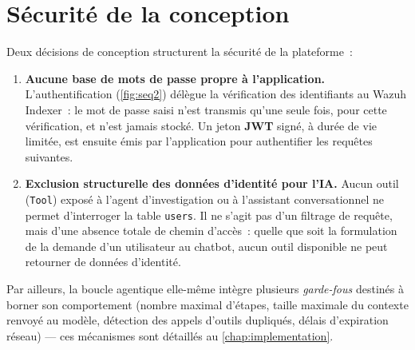 \section{Sécurité de la conception}
\label{sec:securite_conception}

Deux décisions de conception structurent la sécurité de la plateforme~:

\begin{enumerate}
  \item \textbf{Aucune base de mots de passe propre à l'application.}
        L'authentification (\cref{fig:seq2}) délègue la vérification des
        identifiants au Wazuh Indexer~: le mot de passe saisi n'est
        transmis qu'une seule fois, pour cette vérification, et n'est
        jamais stocké. Un jeton \textbf{JWT} signé, à durée de vie limitée,
        est ensuite émis par l'application pour authentifier les requêtes
        suivantes.
  \item \textbf{Exclusion structurelle des données d'identité pour l'IA.}
        Aucun outil (\texttt{Tool}) exposé à l'agent d'investigation ou à
        l'assistant conversationnel ne permet d'interroger la table
        \texttt{users}. Il ne s'agit pas d'un filtrage de requête, mais
        d'une absence totale de chemin d'accès~: quelle que soit la
        formulation de la demande d'un utilisateur au chatbot, aucun outil
        disponible ne peut retourner de données d'identité.
\end{enumerate}

Par ailleurs, la boucle agentique elle-même intègre plusieurs
\textit{garde-fous} destinés à borner son comportement (nombre maximal
d'étapes, taille maximale du contexte renvoyé au modèle, détection des
appels d'outils dupliqués, délais d'expiration réseau) — ces mécanismes sont
détaillés au \cref{chap:implementation}.
